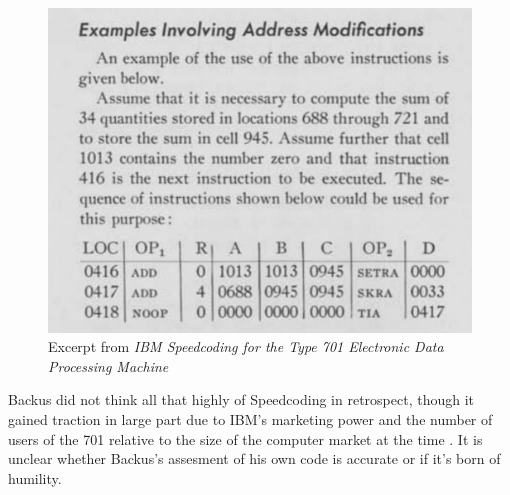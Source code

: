 %

\begin{figure}[h!]
  \centering
  \includegraphics[width=0.5\linewidth]{resource/ibm-speedcoding-example.png}
  \caption{Excerpt from \textit{IBM Speedcoding for the Type 701 Electronic Data Processing Machine} 
  \cite{IBM_1954_Speedcoding}}
  \label{fig:ibm-speedcoding-example}
\end{figure}

Backus did not think all that highly of Speedcoding in retrospect, though it
gained traction in large part due to IBM's marketing power and the number of
users of the 701 relative to the size of the computer market at the time
\cite{Backus_1980_Programming_in_America_in_1950s}.
It is unclear whether Backus's assesment of his own code is accurate or if
it's born of humility.

